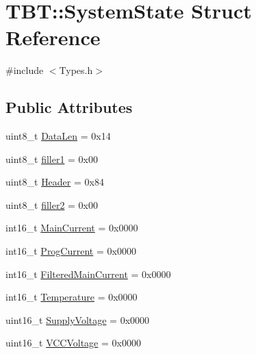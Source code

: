 \hypertarget{structTBT_1_1SystemState}{}\section{T\+BT\+:\+:System\+State Struct Reference}
\label{structTBT_1_1SystemState}


{\ttfamily \#include $<$Types.\+h$>$}

\subsection*{Public Attributes}
\begin{DoxyCompactItemize}
\item 
uint8\+\_\+t \hyperlink{structTBT_1_1SystemState_a17d517bed6954e31982eca5685b36d04_a17d517bed6954e31982eca5685b36d04}{Data\+Len} = 0x14
\item 
uint8\+\_\+t \hyperlink{structTBT_1_1SystemState_a27329736b0b53fc4239397b4e9a0194c_a27329736b0b53fc4239397b4e9a0194c}{filler1} = 0x00
\item 
uint8\+\_\+t \hyperlink{structTBT_1_1SystemState_a2a3724acc75f75f94ea6806fb2d0ad1a_a2a3724acc75f75f94ea6806fb2d0ad1a}{Header} = 0x84
\item 
uint8\+\_\+t \hyperlink{structTBT_1_1SystemState_a2dbecb920543f10343d2e13fe0900a6c_a2dbecb920543f10343d2e13fe0900a6c}{filler2} = 0x00
\item 
int16\+\_\+t \hyperlink{structTBT_1_1SystemState_ad6712d6a9c04e085fd94290b42febf36_ad6712d6a9c04e085fd94290b42febf36}{Main\+Current} = 0x0000
\item 
int16\+\_\+t \hyperlink{structTBT_1_1SystemState_a39dae8a3b2f9789ad770cc1deb6c837b_a39dae8a3b2f9789ad770cc1deb6c837b}{Prog\+Current} = 0x0000
\item 
int16\+\_\+t \hyperlink{structTBT_1_1SystemState_ab1bba48939b28cea2b000bfb7288f1aa_ab1bba48939b28cea2b000bfb7288f1aa}{Filtered\+Main\+Current} = 0x0000
\item 
int16\+\_\+t \hyperlink{structTBT_1_1SystemState_a88b75704f440bbbf3c854bcb6a7d39dc_a88b75704f440bbbf3c854bcb6a7d39dc}{Temperature} = 0x0000
\item 
uint16\+\_\+t \hyperlink{structTBT_1_1SystemState_a85f474c9e82ac4f6add54311e7884364_a85f474c9e82ac4f6add54311e7884364}{Supply\+Voltage} = 0x0000
\item 
uint16\+\_\+t \hyperlink{structTBT_1_1SystemState_a29bdf61d0e42828467ecc5e1b7e3c650_a29bdf61d0e42828467ecc5e1b7e3c650}{V\+C\+C\+Voltage} = 0x0000

\end{DoxyCompactItemize}

